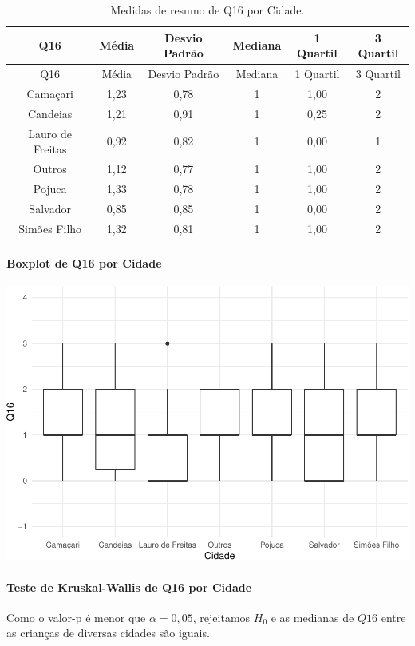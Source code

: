 \documentclass[]{article}
\let\oldparagraph\paragraph
\renewcommand{\paragraph}[1]{\oldparagraph{#1}\mbox{}}
\begin{document}
\begin{longtable}[]{@{}cccccc@{}}
\caption{\label{tab:unnamed-chunk-139}Medidas de resumo de Q16 por Cidade.}\tabularnewline
\toprule
Q16 & Média & Desvio Padrão & Mediana & 1 Quartil & 3 Quartil\tabularnewline
\midrule
\endfirsthead
\toprule
Q16 & Média & Desvio Padrão & Mediana & 1 Quartil & 3 Quartil\tabularnewline
\midrule
\endhead
Camaçari & 1,23 & 0,78 & 1 & 1,00 & 2\tabularnewline
Candeias & 1,21 & 0,91 & 1 & 0,25 & 2\tabularnewline
Lauro de Freitas & 0,92 & 0,82 & 1 & 0,00 & 1\tabularnewline
Outros & 1,12 & 0,77 & 1 & 1,00 & 2\tabularnewline
Pojuca & 1,33 & 0,78 & 1 & 1,00 & 2\tabularnewline
Salvador & 0,85 & 0,85 & 1 & 0,00 & 2\tabularnewline
Simões Filho & 1,32 & 0,81 & 1 & 1,00 & 2\tabularnewline
\bottomrule
\end{longtable}

\hypertarget{boxplot-de-q16-por-cidade}{%
\paragraph{Boxplot de Q16 por Cidade}\label{boxplot-de-q16-por-cidade}}

\begin{center}\includegraphics[width=0.75\linewidth]{relatorio_files/figure-latex/unnamed-chunk-140-1} \end{center}

\hypertarget{teste-de-kruskal-wallis-de-q16-por-cidade}{%
\paragraph{Teste de Kruskal-Wallis de Q16 por Cidade}\label{teste-de-kruskal-wallis-de-q16-por-cidade}}

Como o valor-p é menor que \(\alpha=0,05\), rejeitamos \(H_0\) e as medianas de \(Q16\) entre as crianças de diversas cidades são iguais.
\end{document}

